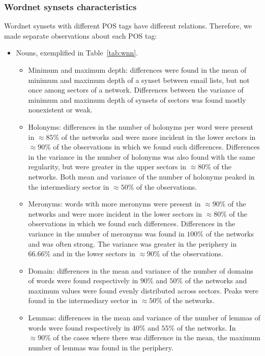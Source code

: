 \subsubsection{Wordnet synsets characteristics}\label{subsec:wn1}
Wordnet synsets with different POS tags have different relations.
Therefore, we made separate observations about each POS tag:
\begin{itemize}
	\item Nouns, exemplified in Table~\ref{tab:wnn}.
		\begin{itemize}
			\item Minimum and maximum depth: 
				differences were found in the mean of minimum and maximum depth of a synset between email lists,
		but not once among sectors of a network.
		Differences between the variance of minimum and maximum depth of synsets of sectors was found mostly nonexistent or weak.
			\item Holonyms:
				differences in the number of holonyms per word were present in $\approx 85\%$ of the networks and were
		more incident in the lower sectors in $\approx 90\%$ of the observations in which we found such differences.
		Differences in the variance in the number of holonyms was also found with the same regularity,
		but were greater in the upper sectors in $\approx 80\%$ of the networks.
				Both mean and variance of the number of holonyms peaked in the intermediary sector in $\approx50\%$ of the observations.
			\item Meronyms:
				words with more meronyms were present in $\approx 90\%$ of the networks and were
		more incident in the lower sectors in $\approx 80\%$ of the observations in which we found such differences.
			Differences in the variance in the number of meronyms was found in $100\%$ of the networks and was often strong.
				The variance was greater in the periphery in $66.66\%$ and in the lower sectors in $\approx 90\%$ of the observations.
			\item Domain:
				differences in the mean and variance of the number of domains of words were found respectively in $90\%$ and $50\%$ of the networks and maximum values were found evenly distributed across sectors.
				Peaks were found in the intermediary sector in $\approx 50\%$ of the networks.
			\item Lemmas:
				differences in the mean and variance of the number of lemmas of words were found respectively in $40\%$ and $55\%$ of the networks.
				In $\approx 90\%$ of the cases where there was difference in the mean, the maximum number of lemmas was found in the periphery.

\end{itemize}
\end{itemize}

